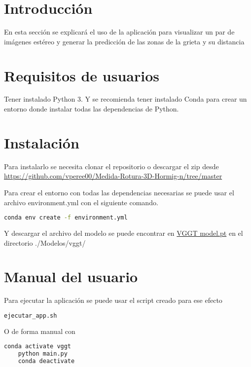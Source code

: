 
\section{Introducción}
En esta sección se explicará el uso de la aplicación para visualizar un par de imágenes estéreo y generar la predicción de las zonas de la grieta y su distancia

\section{Requisitos de usuarios}
Tener instalado Python 3. Y se recomienda tener instalado Conda para crear un entorno donde instalar todas las dependencias de Python.

\section{Instalación}
Para instalarlo se necesita clonar el repositorio o descargar el zip desde \href{https://github.com/vperee00/Medida-Rotura-3D-Hormig-n/tree/master}{https://github.com/vperee00/Medida-Rotura-3D-Hormig-n/tree/master}

Para crear el entorno con todas las dependencias necesarias se puede usar el archivo environment.yml con el siguiente comando.

\begin{lstlisting}[language=bash]
	conda env create -f environment.yml
\end{lstlisting}

Y descargar el archivo del modelo se puede encontrar en \href{https://huggingface.co/facebook/VGGT-1B/blob/main/model.pt}{VGGT model.pt} en el directorio ./Modelos/vggt/

\section{Manual del usuario}
Para ejecutar la aplicación se puede usar el script creado para ese efecto

\begin{lstlisting}[language=bash]
	ejecutar_app.sh
\end{lstlisting}

O de forma manual con 
\begin{lstlisting}[language=bash]
	conda activate vggt
	python main.py
	conda deactivate
\end{lstlisting}

